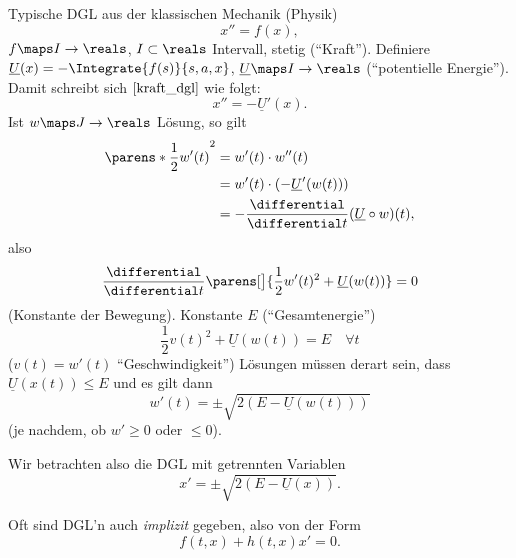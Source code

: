 \begin{bemerkung*}
  Typische DGL aus der klassischen Mechanik (Physik)
  \begin{equation*}
    x''=f(x)\tag{*}\label{kraft_dgl},
  \end{equation*}
  \( f\maps I\to  \reals \), \( I\subset \reals \) Intervall, stetig (\enquote{Kraft}). Definiere \( \underline{U}(x)=-\Integrate{f(s)}{s,a,x} \), \( \underline{U}\maps I\to \reals \) (\enquote{potentielle Energie}). Damit schreibt sich \( \eqref{kraft_dgl} \) wie folgt:
  \begin{equation*}
    x''=-\underline{U}'(x).
  \end{equation*}
  Ist \( w\maps J\to \reals \) Lösung, so gilt
  \begin{align*}
    \parens*{\frac{1}{2}w'(t)}^2&=w'(t)\cdot w''(t)\\
    &=w'(t)\cdot (-\underline{U}'(w(t)))\\
    &=-\frac{\differential}{\differential t}(\underline{U}\circ w)(t),
  \end{align*}
  also
  \begin{equation*}
    \frac{\differential}{\differential t}\parens[\big]{\frac{1}{2}w'(t)^2+\underline{U}(w(t))}=0
  \end{equation*}
  (Konstante der Bewegung). \timplies \texists Konstante \( E \) (\enquote{Gesamtenergie}) \sd
  \begin{equation}
    \frac{1}{2}v(t)^2+\underline{U}(w(t))=E\quad \forall t
  \end{equation}
  (\( v(t)=w'(t) \) \enquote{Geschwindigkeit})
  \timplies Lösungen müssen derart sein, dass \( \underline{U}(x(t))\leq E \) und es gilt dann
  \begin{equation*}
    w'(t)=\pm \sqrt{2(E-\underline{U}(w(t)))}
  \end{equation*}
  (je nachdem, ob \( w'\geq 0 \) oder \( \leq 0 \)).

  Wir betrachten also die DGL mit getrennten Variablen
  \begin{equation*}
    x'=\pm \sqrt{2(E-\underline{U}(x))}.
  \end{equation*}
\end{bemerkung*}
Oft sind DGL'n auch \emph{implizit} gegeben, also von der Form
\begin{equation*}
  f(t,x)+h(t,x)x'=0.
\end{equation*}
